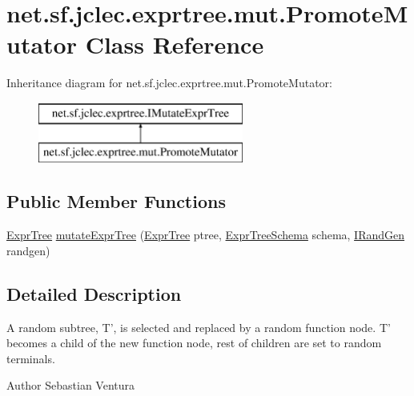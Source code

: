 \hypertarget{classnet_1_1sf_1_1jclec_1_1exprtree_1_1mut_1_1_promote_mutator}{\section{net.\-sf.\-jclec.\-exprtree.\-mut.\-Promote\-Mutator Class Reference}
\label{classnet_1_1sf_1_1jclec_1_1exprtree_1_1mut_1_1_promote_mutator}
}
Inheritance diagram for net.\-sf.\-jclec.\-exprtree.\-mut.\-Promote\-Mutator\-:\begin{figure}[H]
\begin{center}
\leavevmode
\includegraphics[height=2.000000cm]{classnet_1_1sf_1_1jclec_1_1exprtree_1_1mut_1_1_promote_mutator}
\end{center}
\end{figure}
\subsection*{Public Member Functions}
\begin{DoxyCompactItemize}
\item 
\hyperlink{classnet_1_1sf_1_1jclec_1_1exprtree_1_1_expr_tree}{Expr\-Tree} \hyperlink{classnet_1_1sf_1_1jclec_1_1exprtree_1_1mut_1_1_promote_mutator_a381a741fd5cb861827d48ce3daf17e22}{mutate\-Expr\-Tree} (\hyperlink{classnet_1_1sf_1_1jclec_1_1exprtree_1_1_expr_tree}{Expr\-Tree} ptree, \hyperlink{classnet_1_1sf_1_1jclec_1_1exprtree_1_1_expr_tree_schema}{Expr\-Tree\-Schema} schema, \hyperlink{interfacenet_1_1sf_1_1jclec_1_1util_1_1random_1_1_i_rand_gen}{I\-Rand\-Gen} randgen)
\end{DoxyCompactItemize}


\subsection{Detailed Description}
A random subtree, T', is selected and replaced by a random function node. T' becomes a child of the new function node, rest of children are set to random terminals.

\begin{DoxyAuthor}{Author}
Sebastian Ventura 
\end{DoxyAuthor}


